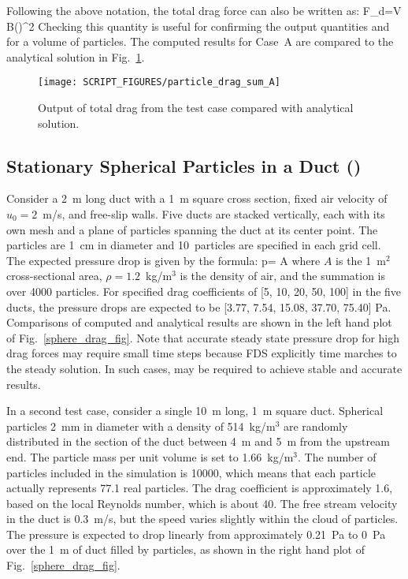 \documentclass[11pt]{book}
\begin{document}
Following the above notation, the total drag force can also be written as:
\be F_d=\rho V B\left(\right)^2 \ee
Checking this quantity is useful for confirming the  output quantities and  for a volume of particles. The computed results for Case~A are compared to the analytical solution in Fig.~\ref{particle_drag_sum}.

\begin{figure}[ht]
\centering
\texttt{[image: SCRIPT\_FIGURES/particle\_drag\_sum\_A]}
\caption[Sample case of  sum]{Output of total drag from the  test case compared with analytical solution.}
\label{particle_drag_sum}
\end{figure}


\subsection{Stationary Spherical Particles in a Duct (\texorpdfstring{}{sphere\_drag})}
\label{sphere_drag_1}
\label{sphere_drag_2}

Consider a 2~m long duct with a 1~m square cross section, fixed air velocity of $u_0=2$~m/s, and free-slip walls. Five ducts are stacked vertically, each with its own mesh and a plane of particles spanning the duct at its center point. The particles are 1~cm in diameter and 10~particles are specified in each grid cell. The expected pressure drop is given by the formula:
\be \Delta p= \rho {} {A} \ee
where $A$ is the 1~m$^2$ cross-sectional area, $\rho=1.2$~kg/m$^3$ is the density of air, and the summation is over 4000 particles. For specified drag coefficients of [5, 10, 20, 50, 100] in the five ducts, the pressure drops are expected to be [3.77, 7.54, 15.08, 37.70, 75.40] Pa.  Comparisons of computed and analytical results are shown in the left hand plot of Fig.~\ref{sphere_drag_fig}.  Note that accurate steady state pressure drop for high drag forces may require small time steps because FDS explicitly time marches to the steady solution.  In such cases,  may be required to achieve stable and accurate results.

In a second test case, consider a single 10~m long, 1~m square duct. Spherical particles 2~mm in diameter with a density of 514~kg/m$^3$ are randomly distributed in the section of the duct between 4~m and 5~m from the upstream end. The particle mass per unit volume is set to 1.66~kg/m$^3$. The number of particles included in the simulation is 10000, which means that each particle actually represents 77.1 real particles. The drag coefficient is approximately 1.6, based on the local Reynolds number, which is about 40. The free stream velocity in the duct is 0.3~m/s, but the speed varies slightly within the cloud of particles. The pressure is expected to drop linearly from approximately 0.21~Pa to 0~Pa over the 1~m of duct filled by particles, as shown in the right hand plot of Fig.~\ref{sphere_drag_fig}.
\end{document}
